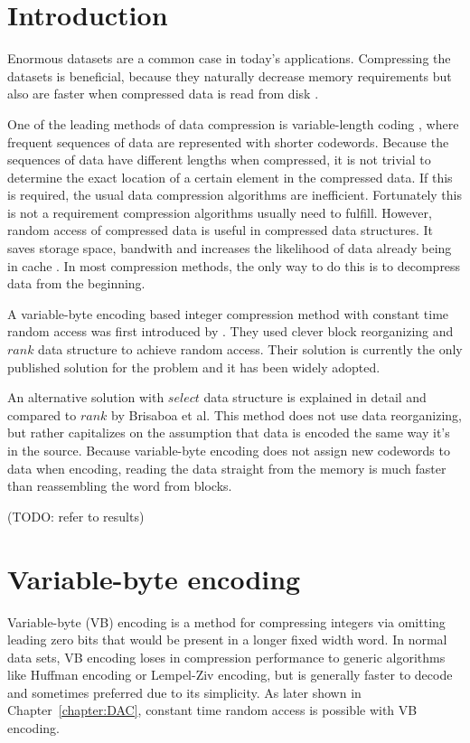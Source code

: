 \chapter{Introduction}
Enormous datasets are a common case in today's applications. Compressing the datasets is beneficial, because they 
naturally decrease memory requirements but also are faster when compressed data is read from disk \citep{Zob95}.

One of the leading methods of data compression is variable-length coding \citep{Sal99}, where frequent sequences of data
are represented with shorter codewords. Because the sequences of data have different lengths when compressed, it is 
not trivial to determine the exact location of a certain element in the compressed data. If this is required, the usual 
data compression algorithms are inefficient. Fortunately this is not a requirement compression algorithms usually need to fulfill. However, 
random access of compressed data is useful in compressed data structures. It saves storage space, bandwith and increases the likelihood
of data already being in cache \citep{Sch02}. In most compression methods, the only way to do this is to decompress data from the beginning. 

A variable-byte encoding based integer compression method with constant time random access was first introduced by \citep{Bri09}. They used clever block 
reorganizing and $rank$ data structure to achieve random access. Their solution is currently the only published solution for the problem and it 
has been widely adopted. 

An alternative solution with $select$ data structure is explained in detail and compared to $rank$ by Brisaboa et al. This method does not use data 
reorganizing, but rather capitalizes on the assumption that data is encoded the same way it's in the source. Because variable-byte encoding does not assign 
new codewords to data when encoding, reading the data straight from the memory is much faster than reassembling the word from blocks. 

(TODO: refer to results)




\chapter{Variable-byte encoding}

Variable-byte (VB) encoding \citep{Wil99} is a method for compressing integers via omitting leading zero bits that would be present in a longer fixed 
width word. In normal data sets, VB encoding loses in compression performance to generic algorithms like Huffman encoding or Lempel-Ziv encoding, but 
is generally faster to decode \citep{Bri09} and sometimes preferred due to its simplicity. As later shown in Chapter~\ref{chapter:DAC}, constant time 
random access is possible with VB encoding.

